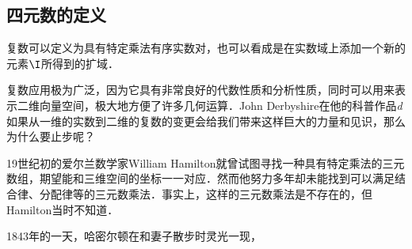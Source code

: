 

\subsection{四元数的定义}

复数可以定义为具有特定乘法有序实数对，也可以看成是在实数域上添加一个新的元素$\I$所得到的扩域．

复数应用极为广泛，因为它具有非常良好的代数性质和分析性质，同时可以用来表示二维向量空间，极大地方便了许多几何运算．John Derbyshire在他的科普作品\textit{d}如果从一维的实数到二维的复数的变更会给我们带来这样巨大的力量和见识，那么为什么要止步呢？

19世纪初的爱尔兰数学家William Hamilton就曾试图寻找一种具有特定乘法的三元数组，期望能和三维空间的坐标一一对应．然而他努力多年却未能找到可以满足结合律、分配律等的三元数乘法．事实上，这样的三元数乘法是不存在的，但Hamilton当时不知道．

1843年的一天，哈密尔顿在和妻子散步时灵光一现，
